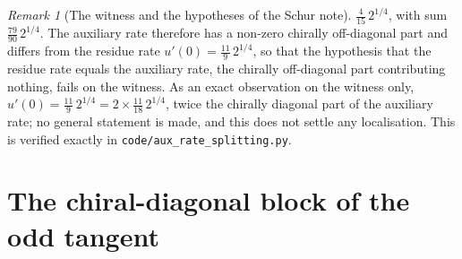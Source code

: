 \documentclass[11pt]{article}
\theoremstyle{definition}
\theoremstyle{remark}
\newtheorem{remark}{Remark}
\begin{document}
\begin{remark}[The witness and the hypotheses of the Schur note]
      $\tfrac{4}{15}\,2^{1/4}$, with sum $\tfrac{79}{90}\,2^{1/4}$.
      The auxiliary rate therefore has a non-zero chirally off-diagonal part and differs from the residue rate
      $u'(0) = \tfrac{11}{9}\,2^{1/4}$, so that the hypothesis that the residue rate equals the auxiliary rate, the
      chirally off-diagonal part contributing nothing, fails on the witness.
      As an exact observation on the witness only, $u'(0) = \tfrac{11}{9}\,2^{1/4} = 2 \times \tfrac{11}{18}\,2^{1/4}$,
      twice the chirally diagonal part of the auxiliary rate; no general statement is made, and this does not settle
      any localisation.
      This is verified exactly in \texttt{code/aux\_rate\_splitting.py}.
    \end{remark}

  \section{The chiral-diagonal block of the odd tangent}
    \label{sec:generator}
\end{document}
